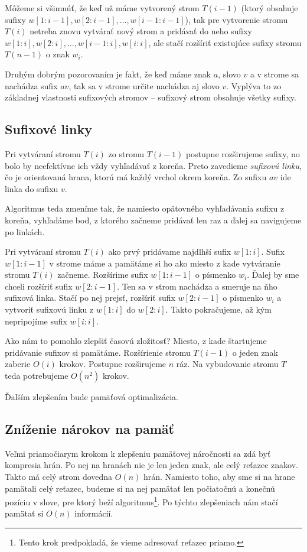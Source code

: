 Môžeme si všimnúť, že keď už máme vytvorený strom 
$T(i-1)$ (ktorý obsahuje sufixy $w[1:{i-1}], w[2:{i-1}], \ldots, 
w[{i-1}:{i-1}]$), tak pre vytvorenie stromu $T(i)$ netreba znovu vytvárať nový 
strom a pridávať do neho sufixy $w[1:i], w[2:i], \ldots, w[{i-1}:i], w[i:i]$, 
ale stačí rozšíriť existujúce sufixy stromu $T(n-1)$ o znak $w_i$.

Druhým dobrým pozorovaním je fakt, že keď máme znak $a$, slovo $v$ 
a v strome sa nachádza sufix $av$, tak sa v strome určite 
nachádza aj slovo $v$. Vyplýva to zo základnej vlastnosti sufixových stromov 
--  sufixový strom obsahuje všetky sufixy.
 
\subsection{Sufixové linky}

Pri vytváraní stromu $T(i)$ zo stromu $T(i-1)$ postupne rozširujeme sufixy, no 
bolo by neefektívne ich vždy vyhľadávať z koreňa. Preto zavedieme 
\emph{sufixovú linku}, čo je orientovaná hrana, ktorú má každý vrchol okrem 
koreňa. Zo sufixu $av$ ide linka do sufixu $v$. 

Algoritmus teda zmeníme tak, že namiesto opätovného vyhľadávania sufixu z 
koreňa, vyhľadáme bod, z ktorého začneme pridávať len raz a ďalej sa 
navigujeme po linkách. 

Pri vytváraní stromu $T(i)$ ako prvý pridávame najdlhší sufix $w[1:i]$. Sufix 
$w[1:i-1]$ v strome máme a pamätáme si ho ako miesto z kade vytváranie stromu 
$T(i)$ začneme. Rozšírime sufix $w[1:i-1]$ o písmenko $w_i$. Ďalej by sme 
chceli rozšíriť sufix $w[2:i-1]$. Ten sa v strom nachádza a smeruje na ňho 
sufixová linka. Stačí po nej prejsť, rozšíriť sufix $w[2:i-1]$ o písmenko 
$w_i$ a vytvoriť sufixovú linku z $w[1:i]$ do $w[2:i]$. Takto pokračujeme, až 
kým nepripojíme sufix $w[i:i]$.

Ako nám to pomohlo zlepšiť časovú zložitosť? Miesto, z kade štartujeme 
pridávanie sufixov si pamätáme. Rozšírienie stromu $T(i-1)$ o jeden znak 
zaberie $O(i)$ krokov. Postupne rozširujeme $n$ ráz. Na vybudovanie stromu $T$ 
teda potrebujeme $O(n^2)$ krokov.

Ďalším zlepšením bude pamäťová optimalizácia.

\subsection{Zníženie nárokov na pamäť}

Veľmi priamočiarym krokom k zlepšeniu pamäťovej náročnosti sa zdá byť 
kompresia hrán. Po nej na hranách 
nie je len jeden znak, ale celý reťazec znakov. Takto má celý strom dovedna 
$O(n)$ hrán. Namiesto toho, aby sme si na hrane 
pamätali celý reťazec, budeme si na nej pamätať len počiatočnú a konečnú 
pozíciu v slove, pre ktorý beží algoritmus\footnote{Tento krok predpokladá, 
že vieme adresovať reťazec priamo.}. Po týchto zlepšeniach nám stačí 
pamätať si $O(n)$ informácií. 

